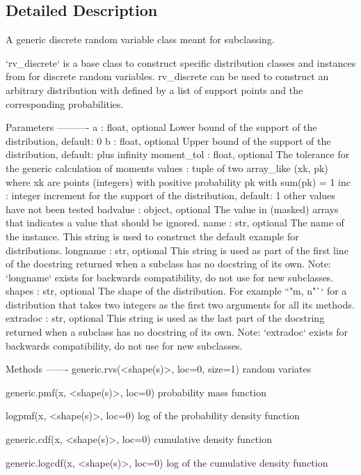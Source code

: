 \subsection{Detailed Description}
\begin{DoxyVerb}A generic discrete random variable class meant for subclassing.

`rv_discrete` is a base class to construct specific distribution classes
and instances from for discrete random variables. rv_discrete can be used
to construct an arbitrary distribution with defined by a list of support
points and the corresponding probabilities.

Parameters
----------
a : float, optional
    Lower bound of the support of the distribution, default: 0
b : float, optional
    Upper bound of the support of the distribution, default: plus infinity
moment_tol : float, optional
    The tolerance for the generic calculation of moments
values : tuple of two array_like
    (xk, pk) where xk are points (integers) with positive probability pk
    with sum(pk) = 1
inc : integer
    increment for the support of the distribution, default: 1
    other values have not been tested
badvalue : object, optional
    The value in (masked) arrays that indicates a value that should be
    ignored.
name : str, optional
    The name of the instance. This string is used to construct the default
    example for distributions.
longname : str, optional
    This string is used as part of the first line of the docstring returned
    when a subclass has no docstring of its own. Note: `longname` exists
    for backwards compatibility, do not use for new subclasses.
shapes : str, optional
    The shape of the distribution. For example ``"m, n"`` for a
    distribution that takes two integers as the first two arguments for all
    its methods.
extradoc :  str, optional
    This string is used as the last part of the docstring returned when a
    subclass has no docstring of its own. Note: `extradoc` exists for
    backwards compatibility, do not use for new subclasses.

Methods
-------
generic.rvs(<shape(s)>, loc=0, size=1)
    random variates

generic.pmf(x, <shape(s)>, loc=0)
    probability mass function

logpmf(x, <shape(s)>, loc=0)
    log of the probability density function

generic.cdf(x, <shape(s)>, loc=0)
    cumulative density function

generic.logcdf(x, <shape(s)>, loc=0)
    log of the cumulative density function


\end{DoxyVerb}
